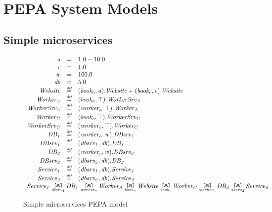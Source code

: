 %
%

\section{PEPA System Models}

%
%
\subsection{Simple microservices}

\begin{figure}
	\caption{Simple microservices PEPA model}
	\centering
	\begin{displaymath}
		\begin{array}{rcl}
			\mathit{a} & = & 1.0-10.0\\
			\mathit{c} & = & 1.0\\
			\mathit{w} & = & 100.0\\
			\mathit{db} & = & 5.0\\
			[0.0ex]		\mathit{Website} & \rmdef & (\mathit{book_a},\mathit{a}).\mathit{Website}+(\mathit{book_c},\mathit{c}).\mathit{Website}\\
			\mathit{Worker_A} & \rmdef & (\mathit{book_a},\top).\mathit{WorkerSrv_A}\\
			\mathit{WorkerSrv_A} & \rmdef & (\mathit{worker_a},\top).\mathit{Worker_A}\\
			\mathit{Worker_C} & \rmdef & (\mathit{book_c},\top).\mathit{WorkerSrv_C}\\
			\mathit{WorkerSrv_C} & \rmdef & (\mathit{worker_c},\top).\mathit{Worker_C}\\
			\mathit{DB_1} & \rmdef & (\mathit{worker_a},\mathit{w}).\mathit{DBsrv_1}\\
			\mathit{DBsrv_1} & \rmdef & (\mathit{dbsrv_1},\mathit{db}).\mathit{DB_1}\\
			\mathit{DB_2} & \rmdef & (\mathit{worker_c},\mathit{w}).\mathit{DBsrv_2}\\
			\mathit{DBsrv_2} & \rmdef & (\mathit{dbsrv_2},\mathit{db}).\mathit{DB_2}\\
			\mathit{Service_1} & \rmdef & (\mathit{dbsrv_1},\mathit{db}).\mathit{Service_1}\\
			\mathit{Service_2} & \rmdef & (\mathit{dbsrv_2},\mathit{db}).\mathit{Service_2}\\
			[0.0ex]		\multicolumn{3}{l}{\mathit{Service_1}\sync{dbsrv_1}\mathit{DB_1}\sync{worker_a}\mathit{Worker_A}\sync{book_a}\mathit{Website}\sync{book_c}\mathit{Worker_C}\sync{worker_c}\mathit{DB_2}\sync{dbsrv_2}\mathit{Service_2}}\\
			[0.0ex]	\end{array}
	\end{displaymath}
\end{figure}

